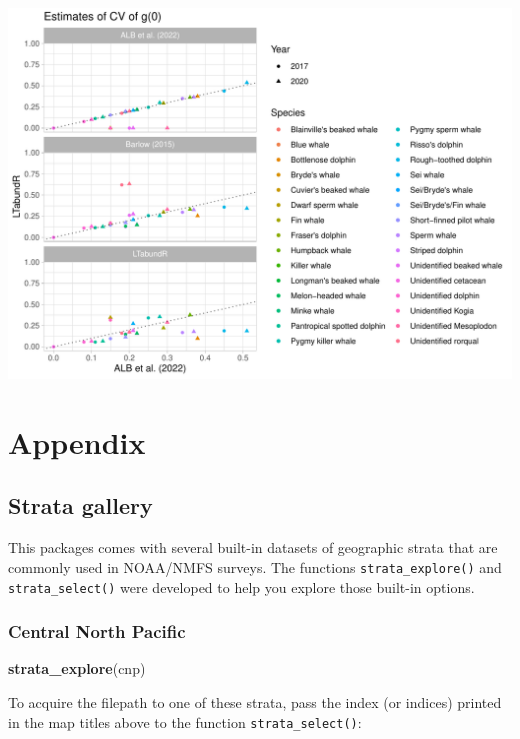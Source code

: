 \documentclass[
]{book}
\newenvironment{Shaded}{\begin{snugshade}}{\end{snugshade}}
\newcommand{\FunctionTok}[1]{\textcolor[rgb]{0.13,0.29,0.53}{\textbf{#1}}}
\newcommand{\NormalTok}[1]{#1}
\newcommand{\StringTok}[1]{\textcolor[rgb]{0.31,0.60,0.02}{#1}}
\begin{document}
\includegraphics{figures/unnamed-chunk-389-1.pdf}

\hypertarget{part-appendix}{%
\part{Appendix}\label{part-appendix}}

\hypertarget{stratagallery}{%
\chapter{Strata gallery}\label{stratagallery}}

This packages comes with several built-in datasets of geographic strata that are commonly used in NOAA/NMFS surveys. The functions \texttt{strata\_explore()} and \texttt{strata\_select()} were developed to help you explore those built-in options.

\hypertarget{central-north-pacific}{%
\section*{Central North Pacific}\label{central-north-pacific}}

\begin{Shaded}
\begin{Highlighting}[]
\FunctionTok{strata\_explore}\NormalTok{(}\StringTok{\textquotesingle{}cnp\textquotesingle{}}\NormalTok{)}
\end{Highlighting}
\end{Shaded}

To acquire the filepath to one of these strata, pass the index (or indices) printed in the map titles above to the function \texttt{strata\_select()}:
\end{document}
